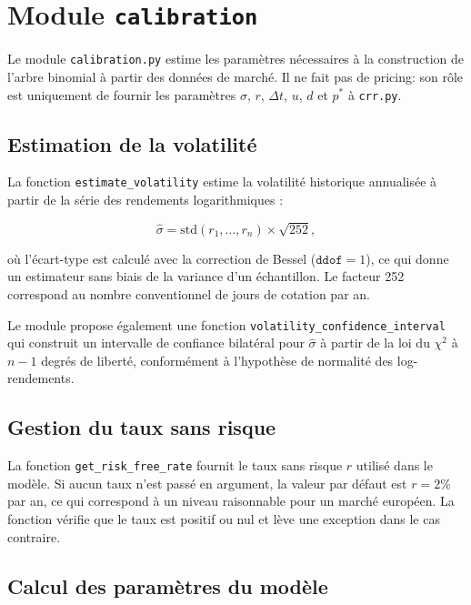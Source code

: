 \documentclass[11pt]{report}
\begin{document}
\section{Module \texttt{calibration}}

Le module \texttt{calibration.py} estime les paramètres nécessaires à la
construction de l'arbre binomial à partir des données de marché.
Il ne fait pas de pricing: son rôle est uniquement de fournir les paramètres
$\sigma$, $r$, $\Delta t$, $u$, $d$ et $p^*$ à \texttt{crr.py}.

\subsection{Estimation de la volatilité}

La fonction \texttt{estimate\_volatility} estime la volatilité historique annualisée
à partir de la série des rendements logarithmiques :

\[
\hat{\sigma} = \text{std}(r_1, \ldots, r_n) \times \sqrt{252},
\]

où l'écart-type est calculé avec la correction de Bessel ($\texttt{ddof} = 1$),
ce qui donne un estimateur sans biais de la variance d'un échantillon.
Le facteur 252 correspond au nombre conventionnel de jours de cotation par an.

Le module propose également une fonction \texttt{volatility\_confidence\_interval}
qui construit un intervalle de confiance bilatéral pour $\hat{\sigma}$ à partir
de la loi du $\chi^2$ à $n-1$ degrés de liberté, conformément à l'hypothèse
de normalité des log-rendements.

\subsection{Gestion du taux sans risque}

La fonction \texttt{get\_risk\_free\_rate} fournit le taux sans risque $r$
utilisé dans le modèle. Si aucun taux n'est passé en argument, la valeur par
défaut est $r = 2\%$ par an, ce qui correspond à un niveau raisonnable pour
un marché européen. La fonction vérifie que le taux est positif ou nul et
lève une exception dans le cas contraire.

\subsection{Calcul des paramètres du modèle}
\end{document}
